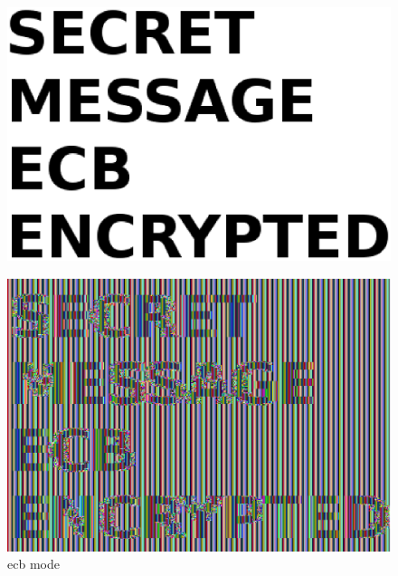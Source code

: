 \begin{minipage}{\linewidth}
      \centering
  \begin{minipage}{0.32\linewidth}
          \begin{figure}[H]
              \includegraphics[width=\linewidth]{figures/ECB.eps}
              \caption{}
              \label{fig:tuxclr}
          \end{figure}
  \end{minipage}
  \begin{minipage}{0.32\linewidth}
          \begin{figure}[H]
              \includegraphics[width=\linewidth]{figures/ECB-enc.eps}
              \caption{\gls{ecb} mode}
              \label{fig:tuxecb}
          \end{figure}

\end{minipage}
\end{minipage}
